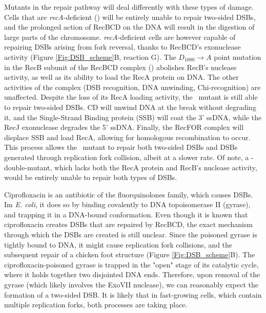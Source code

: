 Mutants in the repair pathway will deal differently with these types of damage. Cells that are \emph{recA}-deficient (\dreca) will be entirely unable to repair two-sided DSBs, and the prolonged action of RecBCD on the DNA will result in the digestion of large parts of the chromosome\cite{Horii1968, Chow2007}. \emph{recA}-deficient cells are however capable of repairing DSBs arising from fork reversal, thanks to RecBCD's exonuclease activity (Figure \ref{Fig:DSB_scheme}B, reaction G)\cite{Seigneur1998, Michel2001}. The $D_{1080} \rightarrow A$ point mutation in the RecB subunit of the RecBCD complex (\teneighty) abolishes RecB's nuclease activity, as well as its ability to load the RecA protein on DNA\cite{Yu1998, Wang2000}. The other activities of the complex (DSB recognition, DNA unwinding, Chi-recognition) are unaffected\cite{Anderson1999}. Despite the loss of its RecA loading activity, the \teneighty\ mutant is still able to repair two-sided DSBs. \teneighty CD will unwind DNA at the break without degrading it, and the Single-Strand Binding protein (SSB) will coat the 3' ssDNA, while the RecJ exonuclease degrades the 5' ssDNA. Finally, the RecFOR complex will displace SSB and load RecA, allowing for homologous recombination to occur. This process allows the \teneighty\ mutant to repair both two-sided DSBs and DSBs generated through replication fork collision, albeit at a slower rate. Of note, a \dreca-\teneighty double-mutant, which lacks both the RecA protein and RecB's nuclease activity, would be entirely unable to repair both types of DSBs.

Ciprofloxacin is an antibiotic of the fluor\-quinolones family, which causes DSBs. Im \emph{E. coli}, it does so by binding covalently to DNA topoisomerase II (gyrase), and trapping it in a DNA-bound conformation\cite{Kohanski2010}. Even though it is known that ciprofloxacin creates DSBs that are repaired by RecBCD, the exact mechanism through which the DSBs are created is still unclear. Since the poisoned gyrase is tightly bound to DNA, it might cause replication fork collisions, and the subsequent repair of a chicken foot structure (Figure \ref{Fig:DSB_scheme}B). The ciprofloxacin-poisoned gyrase is trapped in the "open" stage of its catalytic cycle, where it holds together two disjointed DNA ends. Therefore, upon removal of the gyrase (which likely involves the ExoVII nuclease), we can reasonably expect the formation of a two-sided DSB. It is likely that in fast-growing cells, which contain multiple replication forks, both processes are taking place.

